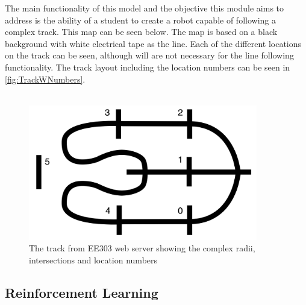 \documentclass[a4paper,12pt]{article}
\begin{document}
\noindent
The main functionality of this model and the objective this module aims to address is the ability of a student to create a robot capable of following a complex track. This map can be seen below. The map is based on a black background with white electrical tape as the line. Each of the different locations on the track can be seen, although will are not necessary for the line following functionality. The track layout including the location numbers can be seen in \autoref{fig:TrackWNumbers}.
\\\\
\begin{figure}[H]
\centering
\includegraphics[width=10cm]{imgs/TrackWNumbers.png}
\caption{The track from EE303 web server showing the complex radii, intersections and location numbers \cite{KevinMcGuinness}}
\label{fig:TrackWNumbers}
\end{figure}

\subsection{Reinforcement Learning}
\end{document}
